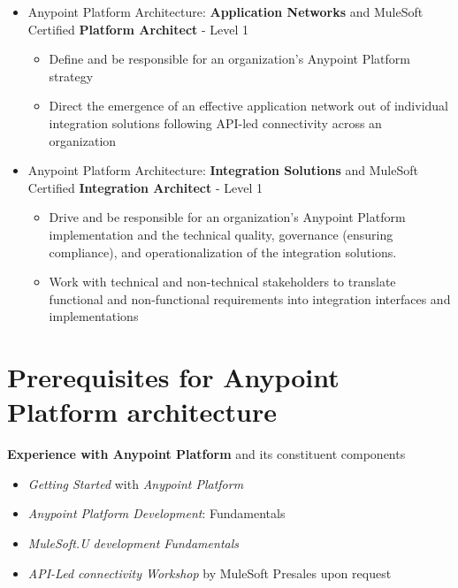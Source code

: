 \begin{itemize}

	\item Anypoint Platform Architecture: \textbf{Application Networks} and MuleSoft Certified \textbf{Platform Architect} - Level 1

	\begin{itemize}
		\item Define and be responsible for an organization's Anypoint Platform strategy
		\item Direct the emergence of an effective application network out of individual integration solutions following API-led connectivity across an organization
	\end{itemize}

	\item Anypoint Platform Architecture: \textbf{Integration Solutions} and MuleSoft Certified \textbf{Integration Architect} - Level 1

	\begin{itemize}
		\item Drive and be responsible for an organization's Anypoint Platform implementation and the technical quality, governance (ensuring compliance), and operationalization of the integration solutions.
		\item Work with technical and non-technical stakeholders to translate functional and non-functional requirements into integration interfaces and implementations
	\end{itemize}

\end{itemize}

\section{Prerequisites for Anypoint Platform architecture}

\textbf{Experience with Anypoint Platform} and its constituent components

\begin{itemize}
	\item \textit{Getting Started} with \textit{Anypoint Platform}
	\item \textit{Anypoint Platform Development}: Fundamentals
	\item \textit{MuleSoft.U development Fundamentals}
	\item \textit{API-Led connectivity Workshop} by MuleSoft Presales upon request
\end{itemize}

